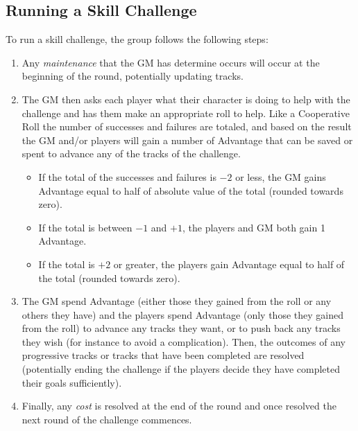 \subsection{Running a Skill Challenge}
To run a skill challenge, the group follows the following steps:
\begin{enumerate}
  \item Any \emph{maintenance} that the GM has determine occurs will occur at the beginning of the round, potentially updating tracks.
  \item The GM then asks each player what their character is doing to help with the challenge and has them make an appropriate roll to help.
    Like a Cooperative Roll the number of successes and failures are totaled, and based on the result the GM and/or players will gain a number of Advantage that can be saved or spent to advance any of the tracks of the challenge.
  \begin{itemize}
    \item If the total of the successes and failures is $-2$ or less, the GM gains Advantage equal to half of absolute value of the total (rounded towards zero).
    \item If the total is between $-1$ and $+1$, the players and GM both gain 1 Advantage.
    \item If the total is $+2$ or greater, the players gain Advantage equal to half of the total (rounded towards zero).
  \end{itemize}
  \item The GM spend Advantage (either those they gained from the roll or any others they have) and the players spend Advantage (only those they gained from the roll) to advance any tracks they want, or to push back any tracks they wish (for instance to avoid a complication).
    Then, the outcomes of any progressive tracks or tracks that have been completed are resolved (potentially ending the challenge if the players decide they have completed their goals sufficiently).
  \item Finally, any \emph{cost} is resolved at the end of the round and once resolved the next round of the challenge commences.
\end{enumerate}

